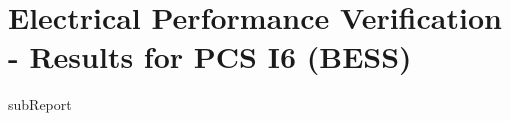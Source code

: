 \renewcommand{\DTRPcs}{I6PPM} %
\renewcommand{\DTRPcsLong}{I6 (BESS)}


    \section{Electrical Performance Verification - Results for PCS \DTRPcsLong}

    {{subReport}}
    \newpage

